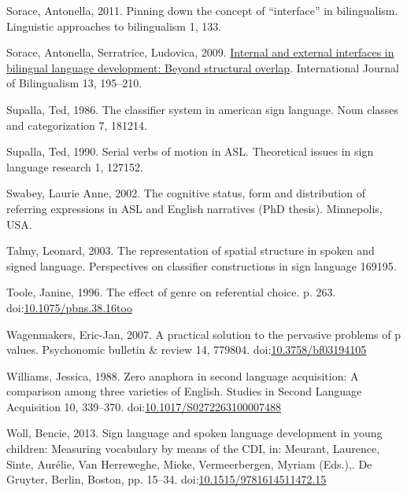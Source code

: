 \documentclass[]{elsarticle} %
\newlength{\cslhangindent}
\newenvironment{CSLReferences}[2] %
 {%
  \setlength{\parindent}{0pt}
  \ifodd #1 \everypar{\setlength{\hangindent}{\cslhangindent}}\ignorespaces\fi
  \ifnum #2 > 0
  \setlength{\parskip}{#2\baselineskip}
  \fi
 }%
 {}
\begin{document}
\begin{CSLReferences}{1}{0}
\leavevmode{}%
Sorace, Antonella, 2011. Pinning down the concept of {``}interface{''}
in bilingualism. Linguistic approaches to bilingualism 1, 133.

\leavevmode{}%
Sorace, Antonella, Serratrice, Ludovica, 2009.
\href{https://doi.org/10.1177/1367006909339810}{Internal and external
interfaces in bilingual language development: Beyond structural
overlap}. International Journal of Bilingualism 13, 195--210.

\leavevmode{}%
Supalla, Ted, 1986. The classifier system in american sign language.
Noun classes and categorization 7, 181214.

\leavevmode{}%
Supalla, Ted, 1990. Serial verbs of motion in ASL. Theoretical issues in
sign language research 1, 127152.

\leavevmode{}%
Swabey, Laurie Anne, 2002. The cognitive status, form and distribution
of referring expressions in ASL and English narratives (PhD thesis).
Minnepolis, USA.

\leavevmode{}%
Talmy, Leonard, 2003. The representation of spatial structure in spoken
and signed language. Perspectives on classifier constructions in sign
language 169195.

\leavevmode{}%
Toole, Janine, 1996. The effect of genre on referential choice. p. 263.
doi:\href{https://doi.org/10.1075/pbns.38.16too}{10.1075/pbns.38.16too}

\leavevmode{}%
Wagenmakers, Eric-Jan, 2007. A practical solution to the pervasive
problems of p values. Psychonomic bulletin \& review 14, 779804.
doi:\href{https://doi.org/10.3758/bf03194105}{10.3758/bf03194105}

\leavevmode{}%
Williams, Jessica, 1988. Zero anaphora in second language acquisition: A
comparison among three varieties of English. Studies in Second Language
Acquisition 10, 339--370.
doi:\href{https://doi.org/10.1017/S0272263100007488}{10.1017/S0272263100007488}

\leavevmode{}%
Woll, Bencie, 2013. Sign language and spoken language development in
young children: Measuring vocabulary by means of the CDI, in: Meurant,
Laurence, Sinte, Aurélie, Van Herreweghe, Mieke, Vermeerbergen, Myriam
(Eds.),. De Gruyter, Berlin, Boston, pp. 15--34.
doi:\href{https://doi.org/10.1515/9781614511472.15}{10.1515/9781614511472.15}

\end{CSLReferences}
\end{document}
